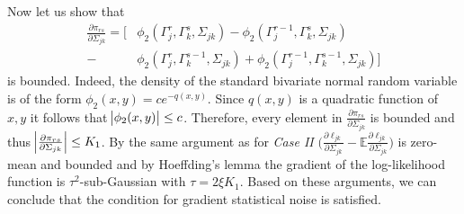 \begin{condition}
    Now let us show that
    \begin{align*}
        \frac{\partial \pi_{rs}}{\partial \Sigma_{jk}}
        = \Big[ & \phi_2({\Gamma}_j^r, {\Gamma}_k^s, \Sigma_{jk}) - \phi_2({\Gamma}_j^{r-1}, {\Gamma}_k^s, \Sigma_{jk})              \\
        -       & \phi_2({\Gamma}_j^r, {\Gamma}_k^{s-1}, \Sigma_{jk}) + \phi_2({\Gamma}_j^{r-1}, {\Gamma}_k^{s-1}, \Sigma_{jk})\Big]
    \end{align*}
    is bounded. Indeed, the density of the standard bivariate normal random variable is of the form $\phi_2(x,y) = c e^{-q(x,y)}$. Since $q(x,y)$ is a quadratic function of $x,y$ it follows that $\abs{\phi_2(x,y)} \leq c$. Therefore, every element in $\frac{\partial \pi_{rs}}{\partial \Sigma_{jk}}$ is bounded and thus $\abs{\frac{\partial \pi_{rs}}{\partial \Sigma_{jk}}} \leq K_1$. By the same argument as for \textit{Case II} $\Big(\frac{\partial\ell_{jk}}{\partial \Sigma_{jk}} - \mathbb{E}\frac{\partial\ell_{jk}}{\partial \Sigma_{jk}} \Big)$ is zero-mean and bounded and by Hoeffding's lemma the gradient of the log-likelihood function is $\tau^2$-sub-Gaussian with $\tau = 2\xi K_1$. Based on these arguments, we can conclude that the condition for gradient statistical noise is satisfied.
\end{condition}

